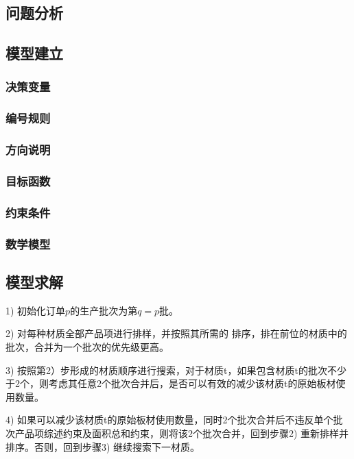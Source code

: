 \documentclass[bwprint]{gmcmthesis}
\begin{document}
\subsection{问题分析}

\subsection{模型建立}

\subsubsection{决策变量}

\subsubsection{编号规则}

\subsubsection{方向说明}

\subsubsection{目标函数}

\subsubsection{约束条件}

\subsubsection{数学模型}

\subsection{模型求解}
1) 初始化订单$p$的生产批次为第$q=p$批。

2) 对每种材质全部产品项进行排样，并按照其所需的  排序，排在前位的材质中的批次，合并为一个批次的优先级更高。

3) 按照第2）步形成的材质顺序进行搜索，对于材质t，如果包含材质t的批次不少于2个，则考虑其任意2个批次合并后，是否可以有效的减少该材质t的原始板材使用数量。

4) 如果可以减少该材质t的原始板材使用数量，同时2个批次合并后不违反单个批次产品项综述约束及面积总和约束，则将该2个批次合并，回到步骤2) 重新排样并排序。否则，回到步骤3) 继续搜索下一材质。
\end{document}
